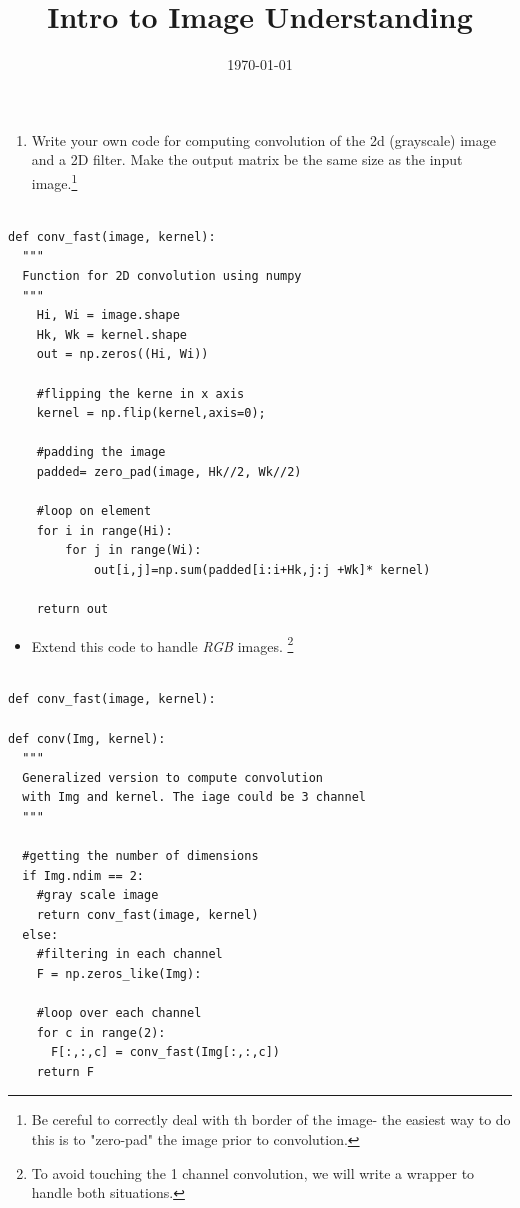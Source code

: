 \documentclass[a4paper]{tufte-handout}
\title{Intro to Image Understanding}
\date{\today}
\begin{document}
\maketitle

\begin{enumerate}
\item Write your own code for computing convolution of the 2d (grayscale) image
  and a 2D filter. Make the output matrix be the same size as the input
  image.\footnote{Be cereful to correctly deal with th border of the image-
    the easiest way to do this is to "zero-pad" the image prior to
  convolution.}
  
\end{enumerate}

\begin{center}
  \begin{verbatim}

def conv_fast(image, kernel):
  """
  Function for 2D convolution using numpy
  """
    Hi, Wi = image.shape
    Hk, Wk = kernel.shape
    out = np.zeros((Hi, Wi))

    #flipping the kerne in x axis
    kernel = np.flip(kernel,axis=0);

    #padding the image
    padded= zero_pad(image, Hk//2, Wk//2)

    #loop on element
    for i in range(Hi):
        for j in range(Wi):
            out[i,j]=np.sum(padded[i:i+Hk,j:j +Wk]* kernel)

    return out
  \end{verbatim}
\end{center}
\begin{itemize}
  \item  Extend this code to handle \emph{RGB} images. \footnote{To avoid touching
    the 1 channel convolution, we will write a wrapper to handle both
    situations.}
\end{itemize}
\begin{center}
  \begin{verbatim}

def conv_fast(image, kernel):

def conv(Img, kernel):
  """
  Generalized version to compute convolution
  with Img and kernel. The iage could be 3 channel 
  """

  #getting the number of dimensions
  if Img.ndim == 2:
    #gray scale image
    return conv_fast(image, kernel)
  else:
    #filtering in each channel
    F = np.zeros_like(Img):
    
    #loop over each channel
    for c in range(2):
      F[:,:,c] = conv_fast(Img[:,:,c])
    return F
  \end{verbatim}
\end{center}
\end{document}
